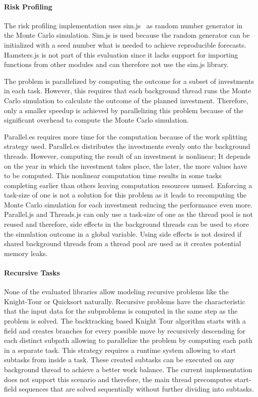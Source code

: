 \paragraph{Risk Profiling}
The risk profiling implementation uses sim.js~\cite{simjs} as random number generator in the Monte Carlo simulation. Sim.js is used because the random generator can be initialized with a seed number what is needed to achieve reproducible forecasts. Hamsters.js is not part of this evaluation since it lacks support for importing functions from other modules and can therefore not use the sim.js library. 

The problem is parallelized by computing the outcome for a subset of investments in each task. However, this requires that each background thread runs the Monte Carlo simulation to calculate the outcome of the planned investment. Therefore, only a smaller speedup is achieved by parallelizing this problem because of the significant overhead to compute the Monte Carlo simulation.

Parallel.es requires more time for the computation because of the work splitting strategy used. Parallel.es distributes the investments evenly onto the background threads. However, computing the result of an investment is nonlinear; It depends on the year in which the investment takes place, the later, the more values have to be computed. This nonlinear computation time results in some tasks completing earlier than others leaving computation resources unused. Enforcing a task-size of one is not a solution for this problem as it leads to recomputing the Monte Carlo simulation for each investment reducing the performance even more. Parallel.js and Threads.js can only use a task-size of one as the thread pool is not reused and therefore, side effects in the background threads can be used to store the simulation outcome in a global variable. Using side effects is not desired if shared background threads from a thread pool are used as it creates potential memory leaks.

\paragraph{Recursive Tasks} 
None of the evaluated libraries allow modeling recursive problems like the Knight-Tour or Quicksort naturally. Recursive problems have the characteristic that the input data for the subproblems is computed in the same step as the problem is solved. The backtracking based Knight Tour algorithm starts with a field and creates branches for every possible move by recursively descending for each distinct subpath allowing to parallelize the problem by computing each path in a separate task. This strategy requires a runtime system allowing to start subtasks from inside a task. These created subtasks can be executed on any background thread to achieve a better work balance. The current implementation does not support this scenario and therefore, the main thread precomputes start-field sequences that are solved sequentially without further dividing into subtasks.


